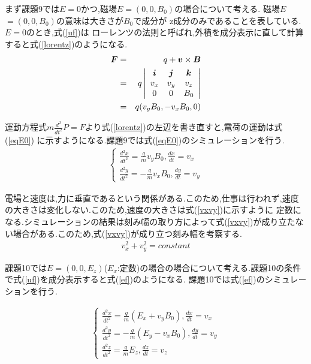 \documentclass[a4j]{jarticle}
\begin{document}
      まず課題9では\mbox{\boldmath $E$}$=0$かつ,磁場\mbox{\boldmath $E$}$=(0,0,B_0)$の場合について考える.
      磁場\mbox{\boldmath $E$}$=(0,0,B_0)$の意味は大きさが$B_0$で成分が
      z成分のみであることを表している. \mbox{\boldmath $E$}$=0$のとき,式(\ref{uf})は
      ローレンツの法則と呼ばれ,外積を成分表示に直して計算すると式(\ref{lorentz})のようになる.
      \begin{eqnarray}
        \mbox{\boldmath $F$} &=& q+\mbox{\boldmath $v$} \times \mbox{\boldmath $B$} \\
        &=& q
        \left|
          \begin{array}{ccc}
            \mbox{\boldmath $i$} & \mbox{\boldmath $j$} & \mbox{\boldmath $k$} \\
            v_x & v_y & v_z \\
            0 & 0 & B_0 
          \end{array}
        \right| \\
        &=& q(v_y B_0,-v_x B_0,0)
      \label{lorentz}
    \end{eqnarray}

    運動方程式$m\frac{d^2}{dt^2}$\mbox{\boldmath $P$}$=$\mbox{\boldmath $F$}より式(\ref{lorentz})の左辺を書き直すと,電荷の運動は式(\ref{eqE0})
    に示すようになる.課題9では式(\ref{eqE0})のシミュレーションを行う.
    \begin{eqnarray}
      \begin{cases}
        \frac{d^2x}{dt^2} = \frac{q}{m}v_y B_0 , \frac{dx}{dt} = v_x \\
        \frac{d^2y}{dt^2} = -\frac{q}{m}v_x B_0 , \frac{dy}{dt} = v_y 
      \end{cases}
      \label{eqE0}
    \end{eqnarray}

    電場と速度は,力に垂直であるという関係がある.このため,仕事は行われず,速度の大きさは変化しない.このため,速度の大きさは式(\ref{vxvy})に示すように
    定数になる.シミュレーションの結果は刻み幅の取り方によって式(\ref{vxvy})が成り立たない場合がある.このため,式(\ref{vxvy})が成り立つ刻み幅を考察する.
    \begin{eqnarray}
      v_x ^2 + v_y ^2 = constant
      \label{vxvy}
    \end{eqnarray}

    課題10では\mbox{\boldmath $E$}$=(0,0,E_z)$($E_x$:定数)の場合の場合について考える.課題10の条件で式(\ref{uf})を成分表示すると式(\ref{ef})のようになる.
    課題10では式(\ref{ef})のシミュレーションを行う.

    \begin{eqnarray}
      \begin{cases}
        \frac{d^2x}{dt^2} = \frac{q}{m}(E_x + v_y B_0) , \frac{dx}{dt} = v_x \\
        \frac{d^2y}{dt^2} = -\frac{q}{m}(E_y - v_x B_0) , \frac{dy}{dt} = v_y \\
        \frac{d^2z}{dt^2} = \frac{q}{m}E_z , \frac{dz}{dt} = v_z
      \end{cases}
      \label{ef}
    \end{eqnarray}
    
\end{document}
